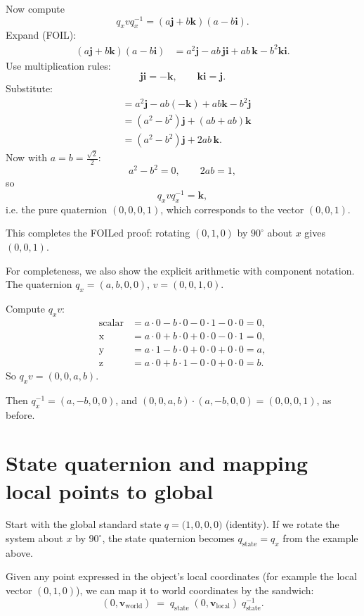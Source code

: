 \documentclass[11pt]{article}
\begin{document}
Now compute
\[
q_x v q_x^{-1} = (a\mathbf{j} + b\mathbf{k})(a - b\mathbf{i}).
\]
Expand (FOIL):
\[
\begin{aligned}
(a\mathbf{j}+b\mathbf{k})(a - b\mathbf{i})
&= a^2\mathbf{j} - ab\,\mathbf{j}\mathbf{i} + ab\,\mathbf{k} - b^2\mathbf{k}\mathbf{i}.
\end{aligned}
\]
Use multiplication rules:
\[
\mathbf{j}\mathbf{i} = -\mathbf{k},\qquad \mathbf{k}\mathbf{i}=\mathbf{j}.
\]
Substitute:
\[
\begin{aligned}
&= a^2\mathbf{j} - ab(-\mathbf{k}) + ab\mathbf{k} - b^2\mathbf{j}\\[4pt]
&= (a^2 - b^2)\mathbf{j} + (ab + ab)\mathbf{k}\\[4pt]
&= (a^2-b^2)\mathbf{j} + 2ab\,\mathbf{k}.
\end{aligned}
\]
Now with \(a=b=\tfrac{\sqrt{2}}{2}\):
\[
a^2-b^2 = 0,\qquad 2ab = 1,
\]
so
\[
q_x v q_x^{-1} = \mathbf{k},
\]
i.e. the pure quaternion \((0,0,0,1)\), which corresponds to the vector \((0,0,1)\).

This completes the FOILed proof: rotating \((0,1,0)\) by \(90^\circ\) about \(x\)
gives \((0,0,1)\).

For completeness, we also show the explicit arithmetic with component notation. The quaternion \(q_x = (a, b, 0, 0)\), \(v = (0, 0, 1, 0)\).

Compute \(q_x v\):
\[
\begin{aligned}
\text{scalar} &= a \cdot 0 - b \cdot 0 - 0 \cdot 1 - 0 \cdot 0 = 0,\\
\text{x} &= a \cdot 0 + b \cdot 0 + 0 \cdot 0 - 0 \cdot 1 = 0,\\
\text{y} &= a \cdot 1 - b \cdot 0 + 0 \cdot 0 + 0 \cdot 0 = a,\\
\text{z} &= a \cdot 0 + b \cdot 1 - 0 \cdot 0 + 0 \cdot 0 = b.
\end{aligned}
\]
So \(q_x v = (0, 0, a, b)\).

Then \(q_x^{-1} = (a, -b, 0, 0)\), and \( (0, 0, a, b) \cdot (a, -b, 0, 0) = (0, 0, 0, 1) \), as before.

\section{State quaternion and mapping local points to global}
Start with the global standard state \(q=\big(1,0,0,0\big)\) (identity).
If we rotate the system about \(x\) by \(90^\circ\), the state quaternion
becomes \(q_{\text{state}} = q_x\) from the example above.

Given any point expressed in the object's local coordinates (for example
the local vector \((0,1,0)\)), we can map it to world coordinates by
the sandwich:
\[
(0,\mathbf{v}_\text{world}) \;=\; q_{\text{state}} \; (0,\mathbf{v}_\text{local}) \; q_{\text{state}}^{-1}.
\]
\end{document}
